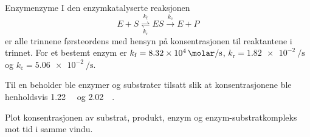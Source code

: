 \begin{exercise}{Enzym}{enzyme}
	I den enzymkatalyserte reaksjonen
	\begin{equation*}
	E + S \underset{k_\mathrm{r}}{\overset{k_\mathrm{f}}{\rightleftharpoons}} ES \overset{k_\mathrm{c}}{\rightarrow} E + P
	\end{equation*}
	er alle trinnene førsteordens med hensyn på konsentrasjonen til reaktantene i trinnet. For et bestemt enzym er $k_\mathrm{f}=\SI{8,32e4}{\per \molar\per\second}$, $k_\mathrm{r}=\SI{1,82e-2}{\per\second}$ og $k_\mathrm{c}=\SI{5,06e-2}{\per\second}$.
	
	Til en beholder ble enzymer og substrater tilsatt slik at konsentrasjonene ble henholdsvis \SI{1,22}{\micro\molar} og \SI{2,02}{\micro\molar}.
	
	Plot konsentrasjonen av substrat, produkt, enzym og enzym-substratkompleks mot tid i samme vindu.
\end{exercise}